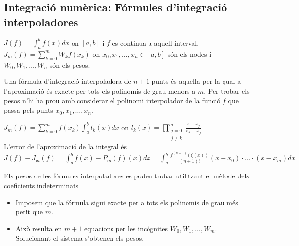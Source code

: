 \documentclass[../main.tex]{subfiles}
\begin{document}
\subsection{Integració numèrica: Fórmules d'integració interpoladores}
$J(f) = \int_a^b f(x) dx$ on $[a, b]$ i $f$ es continua a aquell interval.\\
$J_m(f) = \sum\limits_{k = 0}^m W_k f(x_k)$ on $x_0, x_1, \dots, x_n \in [a, b]$ són els nodes i $W_0, W_1, \dots, W_n$ són els pesos.\\
\begin{definicio}
Una fórmula d'integració interpoladora de $n+1$ punts és aquella per la qual a l'aproximació és exacte per tots els polinomis de grau menors a $m$. Per trobar els pesos n'hi ha prou amb considerar el polinomi interpolador de la funció $f$ que passa pels punts $x_0, x_1, \dots, x_n$.\\
\end{definicio}
$J_m(f) = \sum\limits_{k = 0}^m f(x_k) \int_a^b l_k(x) dx$ on $l_k(x) = \prod\limits_{\substack{j = 0\\j\neq k}}^{m} \frac{x-x_j}{x_k-x_j}$\\
L'error de l'aproximació de la integral és $J(f) - J_m(f) = \int_a^b f(x) - P_m(f)(x) dx = \int_a^b \frac{f^{(n+1)}(\xi(x))}{(n+1)!} (x-x_0) \cdot \ldots \cdot (x-x_m)dx$
\begin{obs}
Els pesos de les fórmules interpoladores es poden trobar utilitzant el mètode dels coeficients indeterminats
\begin{itemize}
\item Imposem que la fórmula sigui exacte per a tots els polinomis de grau més petit que $m$.
\item Això resulta en $m+1$ equacions per les incògnites $W_0, W_1, \dots, W_m$. Solucionant el sistema s'obtenen els pesos.
\end{itemize}
\end{obs}
\end{document}
